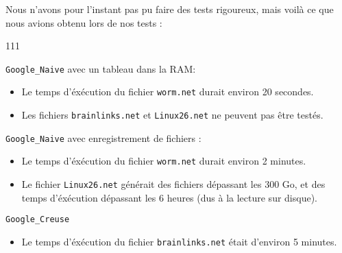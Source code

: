 Nous n'avons pour l'instant pas pu faire des tests rigoureux, mais voilà ce que nous avions obtenu lors de nos tests : 
\begin{dinglist}{111}
   \item \lstinline{Google_Naive} avec un tableau dans la RAM:
   \begin{itemize}
      \item Le temps d'éxécution du fichier \lstinline{worm.net} durait environ 20 secondes.
      \item Les fichiers \lstinline{brainlinks.net} et \lstinline{Linux26.net} ne peuvent pas être testés.
   \end{itemize}
   \item \lstinline{Google_Naive} avec enregistrement de fichiers :
   \begin{itemize}
      \item Le temps d'éxécution du fichier \lstinline{worm.net} durait environ 2 minutes.
      \item Le fichier \lstinline{Linux26.net} générait des fichiers dépassant les 300 Go, et des temps d'éxécution dépassant les 6 heures (dus à la lecture sur disque).
   \end{itemize}
   \item \lstinline{Google_Creuse}
   \begin{itemize}
      \item Le temps d'éxécution du fichier \lstinline{brainlinks.net} était d'environ 5 minutes.
   \end{itemize}
\end{dinglist}